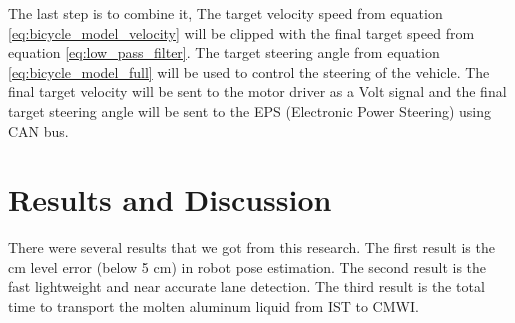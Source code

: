 \documentclass[conference, a4paper]{IEEEtran}[2015/08/26]
\begin{document}
\par    
The last step is to combine it, The target velocity speed from equation \ref{eq:bicycle_model_velocity} will be clipped with the final target speed from equation \ref{eq:low_pass_filter}. The target steering angle from equation \ref{eq:bicycle_model_full} will be used to control the steering of the vehicle. The final target velocity will be sent to the motor driver as a Volt signal and the final target steering angle will be sent to the EPS (Electronic Power Steering) using CAN bus.


\section{Results and Discussion} 
There were several results that we got from this research. The first result is the cm level error (below 5 cm) in robot pose estimation. The second result is the fast lightweight and near accurate lane detection. The third result is the total time to transport the molten aluminum liquid from IST to CMWI. 
\end{document}
